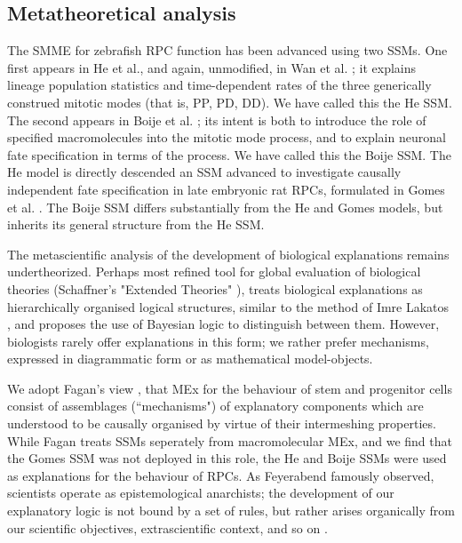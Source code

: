 \documentclass{ut-thesis}
\begin{document}
\begin{NoHyper}
\section{Metatheoretical analysis}

The SMME for zebrafish RPC function has been advanced using two SSMs. One first appears in He et al., and again, unmodified, in Wan et al. \cite{He2012,Wan2016}; it explains lineage population statistics and time-dependent rates of the three generically construed mitotic modes (that is, PP, PD, DD). We have called this the He SSM. The second appears in Boije et al. \cite{Boije2015}; its intent is both to introduce the role of specified macromolecules into the mitotic mode process, and to explain neuronal fate specification in terms of the process. We have called this the Boije SSM. The He model is directly descended an SSM advanced to investigate causally independent fate specification in late embryonic rat RPCs, formulated in Gomes et al. \cite{Gomes2011}. The Boije SSM differs substantially from the He and Gomes models, but inherits its general structure from the He SSM.

The metascientific analysis of the development of biological explanations remains undertheorized. Perhaps most refined tool for global evaluation of biological theories (Schaffner's "Extended Theories" \cite{Schaffner1993}), treats biological explanations as hierarchically organised logical structures, similar to the method of Imre Lakatos \cite{Lakatos1976}, and proposes the use of Bayesian logic to distinguish between them. However, biologists rarely offer explanations in this form; we rather prefer mechanisms, expressed in diagrammatic form or as mathematical model-objects.

We adopt Fagan's view \cite{Fagan2015}, that MEx for the behaviour of stem and progenitor cells consist of assemblages (``mechanisms") of explanatory components which are understood to be causally organised by virtue of their intermeshing properties. While Fagan treats SSMs seperately from macromolecular MEx, and we find that the Gomes SSM was not deployed in this role, the He and Boije SSMs were used as explanations for the behaviour of RPCs. As Feyerabend famously observed, scientists operate as epistemological anarchists; the development of our explanatory logic is not bound by a set of rules, but rather arises organically from our scientific objectives, extrascientific context, and so on \cite{Feyerabend1993}.


\end{NoHyper}
\end{document}
